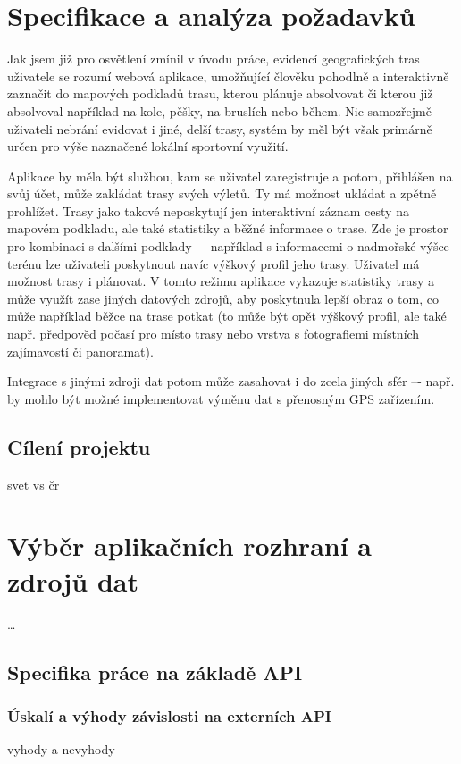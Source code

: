 \chapter{Specifikace a analýza požadavků}

Jak jsem již pro osvětlení zmínil v úvodu práce, evidencí
geografických tras uživatele se rozumí webová aplikace, umožňující
člověku pohodlně a interaktivně zaznačit do mapových podkladů trasu,
kterou plánuje absolvovat či kterou již absolvoval například na kole,
pěšky, na bruslích nebo během. Nic samozřejmě uživateli nebrání
evidovat i jiné, delší trasy, systém by měl být však primárně určen
pro výše naznačené lokální sportovní využití.

Aplikace by měla být službou, kam se uživatel zaregistruje a potom,
přihlášen na svůj účet, může zakládat trasy svých výletů. Ty má
možnost ukládat a zpětně prohlížet. Trasy jako takové neposkytují jen
interaktivní záznam cesty na mapovém podkladu, ale také statistiky a
běžné informace o trase. Zde je prostor pro kombinaci s dalšími
podklady –- například s informacemi o nadmořské výšce terénu lze
uživateli poskytnout navíc výškový profil jeho trasy. Uživatel má
možnost trasy i plánovat. V tomto režimu aplikace vykazuje statistiky
trasy a může využít zase jiných datových zdrojů, aby poskytnula lepší
obraz o tom, co může například běžce na trase potkat (to může být
opět výškový profil, ale také např. předpověď počasí pro místo trasy
nebo vrstva s fotografiemi místních zajímavostí či panoramat).

Integrace s jinými zdroji dat potom může zasahovat i do zcela jiných
sfér –- např. by mohlo být možné implementovat výměnu dat s přenosným
GPS zařízením.

\section{Cílení projektu}
svet vs čr

\chapter{Výběr aplikačních rozhraní a zdrojů dat}
\ldots

\section{Specifika práce na základě API}
\subsection{Úskalí a výhody závislosti na externích API}
vyhody a nevyhody
